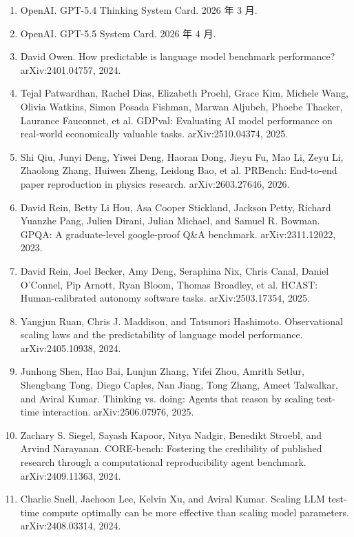 \begin{enumerate}
\item OpenAI. GPT-5.4 Thinking System Card. 2026 年 3 月.

\item OpenAI. GPT-5.5 System Card. 2026 年 4 月.

\item David Owen. How predictable is language model benchmark performance? arXiv:2401.04757, 2024.

\item Tejal Patwardhan, Rachel Dias, Elizabeth Proehl, Grace Kim, Michele Wang, Olivia Watkins, Simon Posada Fishman, Marwan Aljubeh, Phoebe Thacker, Laurance Fauconnet, et al. GDPval: Evaluating AI model performance on real-world economically valuable tasks. arXiv:2510.04374, 2025.

\item Shi Qiu, Junyi Deng, Yiwei Deng, Haoran Dong, Jieyu Fu, Mao Li, Zeyu Li, Zhaolong Zhang, Huiwen Zheng, Leidong Bao, et al. PRBench: End-to-end paper reproduction in physics research. arXiv:2603.27646, 2026.

\item David Rein, Betty Li Hou, Asa Cooper Stickland, Jackson Petty, Richard Yuanzhe Pang, Julien Dirani, Julian Michael, and Samuel R. Bowman. GPQA: A graduate-level google-proof Q\&A benchmark. arXiv:2311.12022, 2023.

\item David Rein, Joel Becker, Amy Deng, Seraphina Nix, Chris Canal, Daniel O'Connel, Pip Arnott, Ryan Bloom, Thomas Broadley, et al. HCAST: Human-calibrated autonomy software tasks. arXiv:2503.17354, 2025.

\item Yangjun Ruan, Chris J. Maddison, and Tatsunori Hashimoto. Observational scaling laws and the predictability of language model performance. arXiv:2405.10938, 2024.

\item Junhong Shen, Hao Bai, Lunjun Zhang, Yifei Zhou, Amrith Setlur, Shengbang Tong, Diego Caples, Nan Jiang, Tong Zhang, Ameet Talwalkar, and Aviral Kumar. Thinking vs. doing: Agents that reason by scaling test-time interaction. arXiv:2506.07976, 2025.

\item Zachary S. Siegel, Sayash Kapoor, Nitya Nadgir, Benedikt Stroebl, and Arvind Narayanan. CORE-bench: Fostering the credibility of published research through a computational reproducibility agent benchmark. arXiv:2409.11363, 2024.

\item Charlie Snell, Jaehoon Lee, Kelvin Xu, and Aviral Kumar. Scaling LLM test-time compute optimally can be more effective than scaling model parameters. arXiv:2408.03314, 2024.


\end{enumerate}
